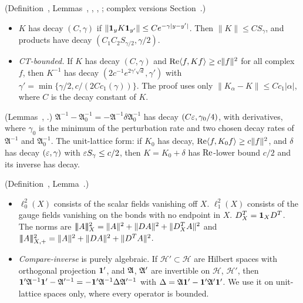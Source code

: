 \begin{description}[style=unboxed,leftmargin=0.8em]
\item[I1. Decay calculus] (Definition~, Lemmas~, , , ; complex versions Section~.)
  \begin{itemize}
  \item $K$ has decay $(C,\gamma)$ if $\|\mathbf 1_yK\mathbf 1_{y'}\|\le Ce^{-\gamma|y-y'|}$. Then $\|K\|\le CS_\gamma$, and products have decay $(C_1C_2S_{\gamma/2},\gamma/2)$.
  \item \emph{CT-bounded.} If $K$ has decay $(C,\gamma)$ and $\operatorname{Re}\langle f,Kf\rangle\ge c\|f\|^2$ for all complex $f$, then $K^{-1}$ has decay $(2c^{-1}e^{2\gamma'\sqrt d},\gamma')$ with $\gamma'=\min\{\gamma/2,c/(2Cc_1(\gamma))\}$. The proof uses only $\|K_\alpha-K\|\le Cc_1|\alpha|$, where $C$ is the decay constant of $K$.
  \end{itemize}
\item[I2. Perturbed inverses] (Lemmas~, .) $\mathfrak A^{-1}-\mathfrak A_0^{-1}=-\mathfrak A^{-1}\delta\mathfrak A_0^{-1}$ has decay $(C\varepsilon,\gamma_0/4)$, with derivatives, where $\gamma_0$ is the minimum of the perturbation rate and two chosen decay rates of $\mathfrak A^{-1}$ and $\mathfrak A_0^{-1}$. The unit-lattice form: if $K_0$ has decay, $\operatorname{Re}\langle f,K_0f\rangle\ge c\|f\|^2$, and $\delta$ has decay $(\varepsilon,\gamma)$ with $\varepsilon S_\gamma\le c/2$, then $K=K_0+\delta$ has $\operatorname{Re}$-lower bound $c/2$ and its inverse has decay.
\item[I3. Domains and compare-inverse] (Definition~, Lemma~.)
  \begin{itemize}
  \item $\ell^2_0(X)$ consists of the scalar fields vanishing off $X$. $\ell^2_1(X)$ consists of the gauge fields vanishing on the bonds with no endpoint in $X$. $D^T_X=\mathbf 1_XD^T$. The norms are $|\!|\!|A|\!|\!|_X^2=\|A\|^2+\|DA\|^2+\|D^T_XA\|^2$ and $|\!|\!|A|\!|\!|_{X,+}^2=\|A\|^2+\|DA\|^2+\|D^TA\|^2$.
  \item \emph{Compare-inverse} is purely algebraic. If $\mathcal H'\subset\mathcal H$ are Hilbert spaces with orthogonal projection $\mathbf 1'$, and $\mathfrak A$, $\mathfrak A'$ are invertible on $\mathcal H$, $\mathcal H'$, then $\mathbf 1'\mathfrak A^{-1}\mathbf 1'-\mathfrak A'^{-1}=-\mathbf 1'\mathfrak A^{-1}\Delta\mathfrak A'^{-1}$ with $\Delta=\mathfrak A\mathbf 1'-\mathbf 1'\mathfrak A'\mathbf 1'$. We use it on unit-lattice spaces only, where every operator is bounded.
  \end{itemize}

\end{description}
